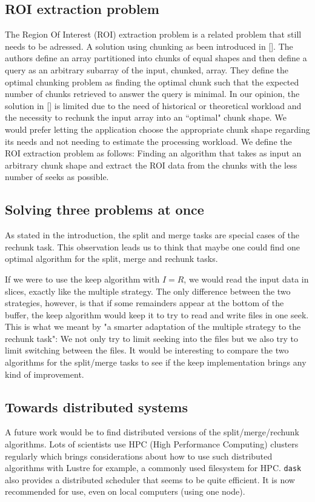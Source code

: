 \documentclass[conference]{IEEEtran}
\begin{document}
\subsection{ROI extraction problem}
The Region Of Interest (ROI) extraction problem is a related problem that still needs
to be adressed. A solution using chunking as been introduced in []. The authors
define an array partitioned into chunks of equal shapes and then define a
query as an arbitrary subarray of the input, chunked, array. They define the
optimal chunking problem as finding the optimal chunk such that the expected
number of chunks retrieved to answer the query is minimal. In our opinion, the
solution in [] is limited due to the need of historical or theoretical workload
and the necessity to rechunk the input array into an ``optimal" chunk shape. We
would prefer letting the application choose the appropriate chunk shape
regarding its needs and not needing to estimate the processing workload. We
define the ROI extraction problem as follows: Finding an algorithm that takes
as input an arbitrary chunk shape and extract the ROI data from the chunks with
the less number of seeks as possible.

\subsection{Solving three problems at once}
As stated in the introduction, the split and merge tasks are special cases of
the rechunk task. This observation leads us to think that maybe one could find
one optimal algorithm for the split, merge and rechunk tasks.

If we were to use the keep algorithm with $I=R$, we would read the input data
in slices, exactly like the multiple strategy. The only difference between the
two strategies, however, is that if some remainders appear at the bottom of the
buffer, the keep algorithm would keep it to try to read and write files in one
seek. This is what we meant by "a smarter adaptation of the multiple strategy
to the rechunk task": We not only try to limit seeking into the files but we
also try to limit switching between the files. It would be interesting to
compare the two algorithms for the split/merge tasks to see if the keep
implementation brings any kind of improvement.

\subsection{Towards distributed systems}
A future work would be to find distributed versions of the split/merge/rechunk
algorithms. Lots of scientists use HPC (High Performance Computing) clusters
regularly which brings considerations about how to use such distributed
algorithms with Lustre for example, a commonly used filesystem for HPC. \texttt{dask}
also provides a distributed scheduler that seems to be quite efficient. It is
now recommended for use, even on local computers (using one node).
\end{document}

